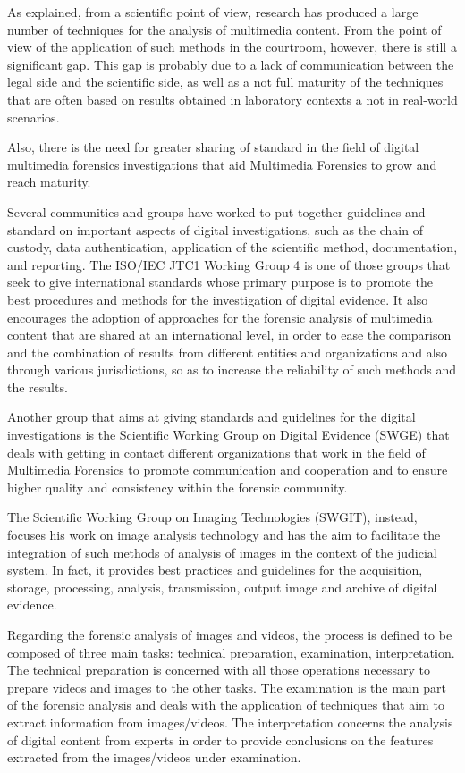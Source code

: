 As explained, from a scientific point of view, research has produced a large number of techniques for the analysis of multimedia content. From the point of view of the application of such methods in the courtroom, however, there is still a significant gap. This gap is probably due to a lack of communication between the legal side and the scientific side, as well as a not full maturity of the techniques that are often based on results obtained in laboratory contexts a not in real-world scenarios.

Also, there is the need for greater sharing of standard in the field of digital multimedia forensics investigations that aid Multimedia Forensics to grow and reach maturity.

Several communities and groups have worked to put together guidelines and standard on important aspects of digital investigations, such as the chain of custody, data authentication, application of the scientific method, documentation, and reporting.
The ISO/IEC JTC1 Working Group 4 is one of those groups that seek to give international standards whose primary purpose is to promote the best procedures and methods for the investigation of digital evidence. It also encourages the adoption of approaches for the forensic analysis of multimedia content that are shared at an international level, in order to ease the comparison and the combination of results from different entities and organizations and also through various jurisdictions, so as to increase the reliability of such methods and the results.

Another group that aims at giving standards and guidelines for the digital investigations is the Scientific Working Group on Digital Evidence (SWGE) that deals with getting in contact different organizations that work in the field of Multimedia Forensics to promote communication and cooperation and to ensure higher quality and consistency within the forensic community.

The Scientific Working Group on Imaging Technologies (SWGIT), instead, focuses his work on image analysis technology and has the aim to facilitate the integration of such methods of analysis of images in the context of the judicial system. In fact, it provides best practices and guidelines for the acquisition, storage, processing, analysis, transmission, output image and archive of digital evidence.

Regarding the forensic analysis of images and videos, the process is defined to be composed of three main tasks: technical preparation, examination, interpretation. The technical preparation is concerned with all those operations necessary to prepare videos and images to the other tasks. The examination is the main part of the forensic analysis and deals with the application of techniques that aim to extract information from images/videos. The interpretation concerns the analysis of digital content from experts in order to provide conclusions on the features extracted from the images/videos under examination.

